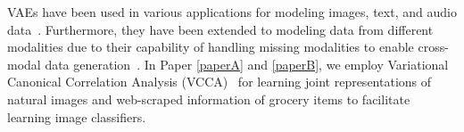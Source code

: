 \vspace{3mm}
VAEs have been used in various applications for modeling images, text, and audio data~\cite{gregor2015draw, mansimov2015generating, pu2016variational, razavi2019generating, chung2015recurrent, serban2017hierarchical, li2018disentangled}.
 Furthermore, they have been extended to modeling data from different modalities due to their capability of handling missing modalities to enable cross-modal data generation~\cite{wang2016deep, wu2018multimodal, shi2019variational, vedantam2017generative, suzuki2016joint}. In Paper \ref{paperA} and \ref{paperB}, we employ Variational Canonical Correlation Analysis (VCCA)~\cite{wang2016deep} for learning joint representations of natural images and web-scraped information of grocery items to facilitate learning image classifiers. 



